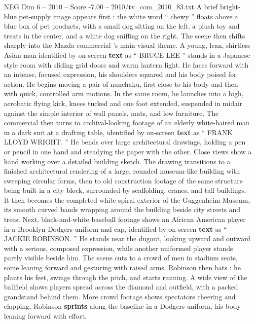 \begin{textsample}{NEG Dim 6 – 2010 – Score -7.00 – 2010/tv\_com\_2010\_83.txt}  \label{ex:f6_neg_001}
A brief bright-blue pet-supply image appears first : the white word “ chewy ” floats above a blue box of pet products, with a small dog sitting on the left, a plush toy and treats in the center, and a white dog sniffing on the right.
The scene then shifts sharply into the Mazda commercial ’s main visual theme.
A young, lean, shirtless Asian man identified by on-screen \textbf{text} as “ BRUCE LEE ” stands in a Japanese-style room with sliding grid doors and warm lantern light.
He faces forward with an intense, focused expression, his shoulders squared and his body poised for action.
He begins moving a pair of nunchaku, first close to his body and then with quick, controlled arm motions.
In the same room, he launches into a high, acrobatic flying kick, knees tucked and one foot extended, suspended in midair against the simple interior of wall panels, mats, and low furniture.
The commercial then turns to archival-looking footage of an elderly white-haired man in a dark suit at a drafting table, identified by on-screen \textbf{text} as “ FRANK LLOYD WRIGHT. ” He bends over large architectural drawings, holding a pen or pencil in one hand and steadying the paper with the other.
Close views show a hand working over a detailed building sketch.
The drawing transitions to a finished architectural rendering of a large, rounded museum-like building with sweeping circular forms, then to old construction footage of the same structure being built in a city block, surrounded by scaffolding, cranes, and tall buildings.
It then becomes the completed white spiral exterior of the Guggenheim Museum, its smooth curved bands wrapping around the building beside city streets and trees.
Next, black-and-white baseball footage shows an African American player in a Brooklyn Dodgers uniform and cap, identified by on-screen \textbf{text} as “ JACKIE ROBINSON. ” He stands near the dugout, looking upward and outward with a serious, composed expression, while another uniformed player stands partly visible beside him.
The scene cuts to a crowd of men in stadium seats, some leaning forward and gesturing with raised arms.
Robinson then bats : he plants his feet, swings through the pitch, and starts running.
A wide view of the ballfield shows players spread across the diamond and outfield, with a packed grandstand behind them.
More crowd footage shows spectators cheering and clapping.
Robinson \textbf{sprints} along the baseline in a Dodgers uniform, his body leaning forward with effort.

\end{textsample}
